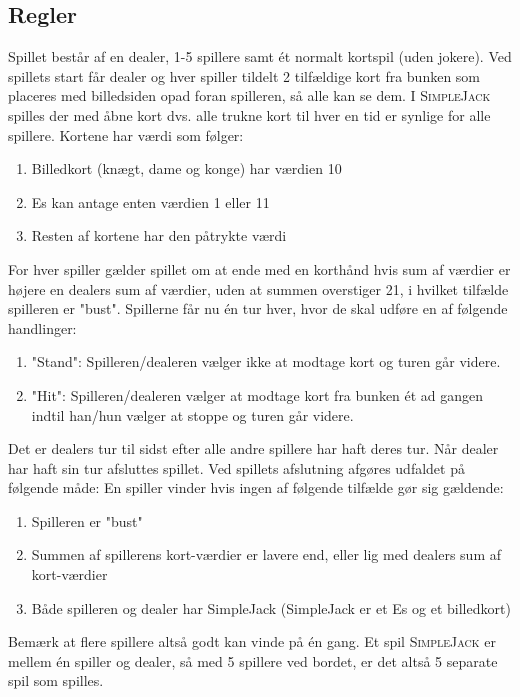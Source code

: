 \documentclass[12pt]{article}
\newcommand{\sbl}{\textsc{SimpleJack }}
\begin{document}
\subsection*{Regler}
Spillet består af en dealer, 1-5 spillere samt ét normalt kortspil (uden jokere). Ved spillets start
får dealer og hver spiller tildelt 2 tilfældige kort fra bunken som placeres med billedsiden opad foran spilleren, så alle kan se
dem. I \sbl spilles der med åbne kort dvs. alle trukne kort til hver en tid er synlige for alle spillere.
Kortene har værdi som følger:
\begin{enumerate}
\item Billedkort (knægt, dame og konge) har værdien 10
\item Es kan antage enten værdien 1 eller 11
\item Resten af kortene har den påtrykte værdi
\end{enumerate}
For hver spiller gælder spillet om at ende med en korthånd hvis sum af værdier er højere en dealers sum af værdier, 
uden at summen overstiger 21, i hvilket tilfælde spilleren er "bust".
Spillerne får nu én tur hver, hvor de skal udføre en af følgende handlinger:
\begin{enumerate}
\item "Stand": Spilleren/dealeren vælger ikke at modtage kort og turen går videre.
\item "Hit": Spilleren/dealeren vælger at modtage kort fra bunken ét ad gangen indtil han/hun 
vælger at stoppe og turen går videre.
\end{enumerate}
Det er dealers tur til sidst efter alle andre spillere har haft deres tur. Når dealer har haft sin tur afsluttes spillet.
Ved spillets afslutning afgøres udfaldet på følgende måde:
En spiller vinder hvis ingen af følgende tilfælde gør sig gældende:
\begin{enumerate}
\item Spilleren er "bust"
\item Summen af spillerens kort-værdier er lavere end, eller lig med dealers sum af kort-værdier
\item Både spilleren og dealer har SimpleJack (SimpleJack er et Es og et billedkort)
\end{enumerate}
Bemærk at flere spillere altså godt kan vinde på én gang. Et spil \sbl er mellem én spiller og dealer, 
så med 5 spillere ved bordet, er det altså 5 separate spil som spilles.
\end{document}
